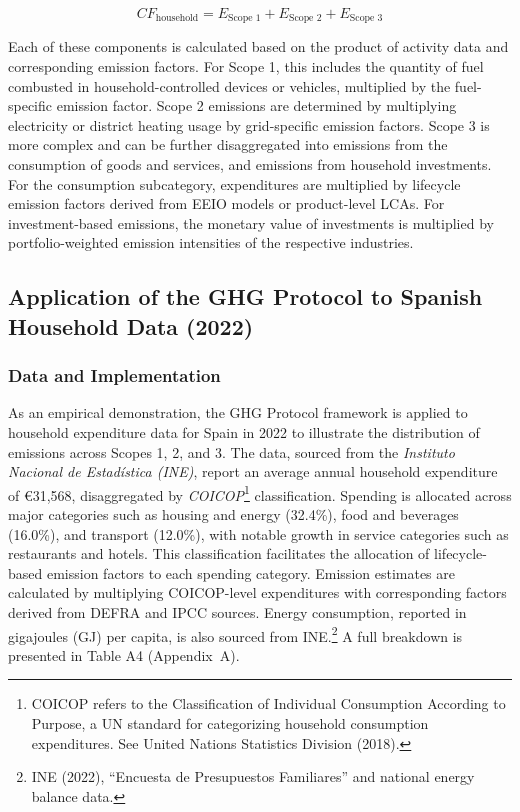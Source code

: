 \documentclass[12pt,a4paper]{article}%
\begin{document}
\begin{equation}
CF_{\text{household}} = E_{\text{Scope 1}} + E_{\text{Scope 2}} + E_{\text{Scope 3}}
\end{equation}

Each of these components is calculated based on the product of activity data and corresponding emission factors. For Scope 1, this includes the quantity of fuel combusted in household-controlled devices or vehicles, multiplied by the fuel-specific emission factor. Scope 2 emissions are determined by multiplying electricity or district heating usage by grid-specific emission factors. Scope 3 is more complex and can be further disaggregated into emissions from the consumption of goods and services, and emissions from household investments. For the consumption subcategory, expenditures are multiplied by lifecycle emission factors derived from EEIO models or product-level LCAs. For investment-based emissions, the monetary value of investments is multiplied by portfolio-weighted emission intensities of the respective industries.

\subsection{Application of the GHG Protocol to Spanish Household Data (2022)}

\subsubsection{Data and Implementation}
As an empirical demonstration, the GHG Protocol framework is applied to household expenditure data for Spain in 2022 to illustrate the distribution of emissions across Scopes 1, 2, and 3. The data, sourced from the \textit{Instituto Nacional de Estadística (INE)}, report an average annual household expenditure of €31,568, disaggregated by \textit{COICOP}\footnote{COICOP refers to the Classification of Individual Consumption According to Purpose, a UN standard for categorizing household consumption expenditures. See United Nations Statistics Division (2018).} classification. Spending is allocated across major categories such as housing and energy (32.4\%), food and beverages (16.0\%), and transport (12.0\%), with notable growth in service categories such as restaurants and hotels. This classification facilitates the allocation of lifecycle-based emission factors to each spending category. Emission estimates are calculated by multiplying COICOP-level expenditures with corresponding factors derived from DEFRA and IPCC sources. Energy consumption, reported in gigajoules (GJ) per capita, is also sourced from INE.\footnote{INE (2022), ``Encuesta de Presupuestos Familiares'' and national energy balance data.} A full breakdown is presented in Table A4 (Appendix~A).
\end{document}
